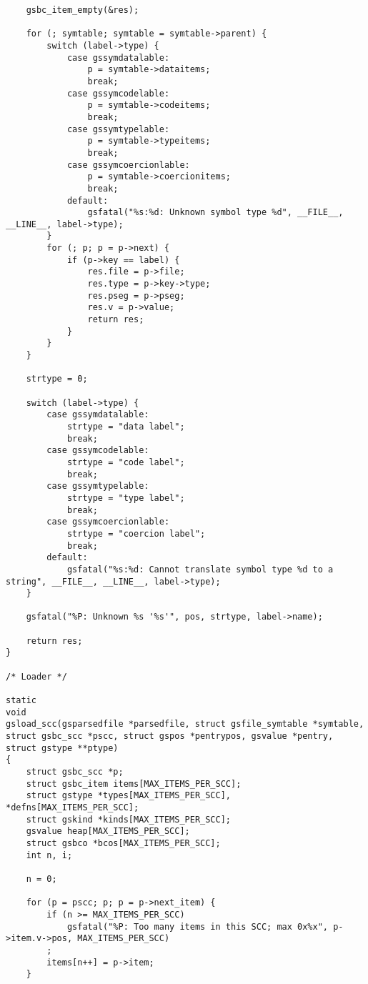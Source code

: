 \documentclass{report}
\begin{document}
\begin{verbatim}
    gsbc_item_empty(&res);

    for (; symtable; symtable = symtable->parent) {
        switch (label->type) {
            case gssymdatalable:
                p = symtable->dataitems;
                break;
            case gssymcodelable:
                p = symtable->codeitems;
                break;
            case gssymtypelable:
                p = symtable->typeitems;
                break;
            case gssymcoercionlable:
                p = symtable->coercionitems;
                break;
            default:
                gsfatal("%s:%d: Unknown symbol type %d", __FILE__, __LINE__, label->type);
        }
        for (; p; p = p->next) {
            if (p->key == label) {
                res.file = p->file;
                res.type = p->key->type;
                res.pseg = p->pseg;
                res.v = p->value;
                return res;
            }
        }
    }

    strtype = 0;

    switch (label->type) {
        case gssymdatalable:
            strtype = "data label";
            break;
        case gssymcodelable:
            strtype = "code label";
            break;
        case gssymtypelable:
            strtype = "type label";
            break;
        case gssymcoercionlable:
            strtype = "coercion label";
            break;
        default:
            gsfatal("%s:%d: Cannot translate symbol type %d to a string", __FILE__, __LINE__, label->type);
    }

    gsfatal("%P: Unknown %s '%s'", pos, strtype, label->name);

    return res;
}

/* Loader */

static
void
gsload_scc(gsparsedfile *parsedfile, struct gsfile_symtable *symtable, struct gsbc_scc *pscc, struct gspos *pentrypos, gsvalue *pentry, struct gstype **ptype)
{
    struct gsbc_scc *p;
    struct gsbc_item items[MAX_ITEMS_PER_SCC];
    struct gstype *types[MAX_ITEMS_PER_SCC], *defns[MAX_ITEMS_PER_SCC];
    struct gskind *kinds[MAX_ITEMS_PER_SCC];
    gsvalue heap[MAX_ITEMS_PER_SCC];
    struct gsbco *bcos[MAX_ITEMS_PER_SCC];
    int n, i;

    n = 0;

    for (p = pscc; p; p = p->next_item) {
        if (n >= MAX_ITEMS_PER_SCC)
            gsfatal("%P: Too many items in this SCC; max 0x%x", p->item.v->pos, MAX_ITEMS_PER_SCC)
        ;
        items[n++] = p->item;
    }


\end{verbatim}
\end{document}
